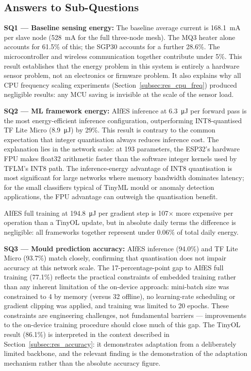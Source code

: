 \subsection{Answers to Sub-Questions}\label{subsec:res_sq_answers}

\textbf{SQ1 --- Baseline sensing energy:} The baseline average current is \SI{168.1}{\milli\ampere} per slave node (\SI{528}{\milli\ampere} for the full three-node mesh). The MQ3 heater alone accounts for 61.5\% of this; the SGP30 accounts for a further 28.6\%. The microcontroller and wireless communication together contribute under 5\%. This result establishes that the energy problem in this system is entirely a hardware sensor problem, not an electronics or firmware problem. It also explains why all CPU frequency scaling experiments (Section~\ref{subsec:res_cpu_freq}) produced negligible results: any MCU saving is invisible at the scale of the sensor load.

\textbf{SQ2 --- ML framework energy:} AIfES inference at \SI{6.3}{\micro\joule} per forward pass is the most energy-efficient inference configuration, outperforming INT8-quantised TF Lite Micro (\SI{8.9}{\micro\joule}) by 29\%. This result is contrary to the common expectation that integer quantisation always reduces inference cost. The explanation lies in the network scale: at 193 parameters, the ESP32's hardware FPU makes float32 arithmetic faster than the software integer kernels used by TFLM's INT8 path. The inference-energy advantage of INT8 quantisation is most significant for large networks where memory bandwidth dominates latency; for the small classifiers typical of TinyML mould or anomaly detection applications, the FPU advantage can outweigh the quantisation benefit.

AIfES full training at \SI{194.8}{\micro\joule} per gradient step is 107$\times$ more expensive per operation than a TinyOL update, but in absolute daily terms the difference is negligible: all frameworks together represent under 0.06\% of total daily energy.

\textbf{SQ3 --- Mould prediction accuracy:} AIfES inference (94.0\%) and TF Lite Micro (93.7\%) match closely, confirming that quantisation does not impair accuracy at this network scale. The 17-percentage-point gap to AIfES full training (77.1\%) reflects the practical constraints of embedded training rather than any inherent limitation of the on-device approach: mini-batch size was constrained to 4 by memory (versus 32 offline), no learning-rate scheduling or gradient clipping was applied, and training was limited to 20 epochs. These constraints are engineering challenges, not fundamental barriers --- improvements to the on-device training procedure should close much of this gap. The TinyOL result (86.1\%) is interpreted in the context described in Section~\ref{subsec:res_accuracy}: it demonstrates adaptation from a deliberately limited backbone, and the relevant finding is the demonstration of the adaptation mechanism rather than the absolute accuracy figure.

